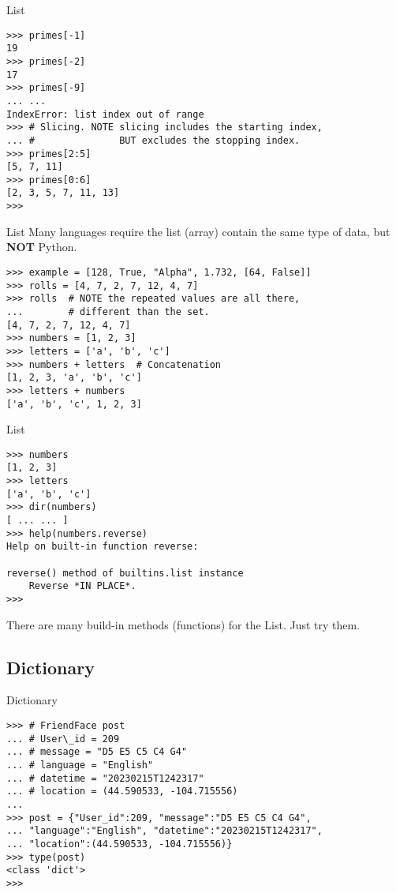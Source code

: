 \documentclass{beamer}
\begin{document}
\begin{frame}[fragile]{List}
\begin{verbatim}
>>> primes[-1]
19
>>> primes[-2]
17
>>> primes[-9]
... ...
IndexError: list index out of range
>>> # Slicing. NOTE slicing includes the starting index,
... #               BUT excludes the stopping index.
>>> primes[2:5]
[5, 7, 11]
>>> primes[0:6]
[2, 3, 5, 7, 11, 13]
>>>
\end{verbatim}
\end{frame}

\begin{frame}[fragile]{List}
Many languages require the list (array) contain the same type of data, 
but \textbf{NOT} Python.\\
\begin{verbatim}
>>> example = [128, True, "Alpha", 1.732, [64, False]]
>>> rolls = [4, 7, 2, 7, 12, 4, 7]
>>> rolls  # NOTE the repeated values are all there, 
...        # different than the set.
[4, 7, 2, 7, 12, 4, 7]
>>> numbers = [1, 2, 3]
>>> letters = ['a', 'b', 'c']
>>> numbers + letters  # Concatenation
[1, 2, 3, 'a', 'b', 'c']
>>> letters + numbers
['a', 'b', 'c', 1, 2, 3]
\end{verbatim}
\end{frame}

\begin{frame}[fragile]{List}
\begin{verbatim}
>>> numbers
[1, 2, 3]
>>> letters
['a', 'b', 'c']
>>> dir(numbers)
[ ... ... ]
>>> help(numbers.reverse)
Help on built-in function reverse:

reverse() method of builtins.list instance
    Reverse *IN PLACE*.
>>> 
\end{verbatim}
There are many build-in methods (functions) for the List. Just try them.
\end{frame}

\subsection{Dictionary}

\begin{frame}[fragile]{Dictionary}
\begin{verbatim}
>>> # FriendFace post
... # User\_id = 209
... # message = "D5 E5 C5 C4 G4"
... # language = "English"
... # datetime = "20230215T1242317"
... # location = (44.590533, -104.715556)
... 
>>> post = {"User_id":209, "message":"D5 E5 C5 C4 G4",
... "language":"English", "datetime":"20230215T1242317",
... "location":(44.590533, -104.715556)}
>>> type(post)
<class 'dict'>
>>> 
\end{verbatim}
\end{frame}
\end{document}
